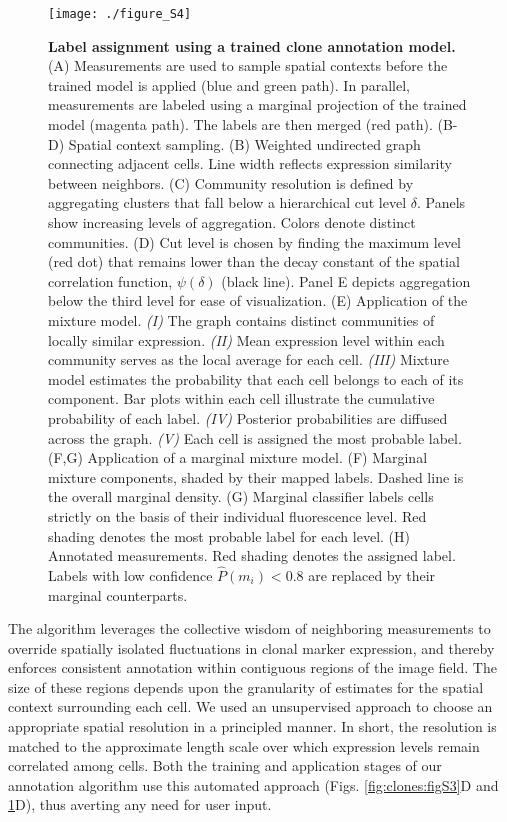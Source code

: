 \begin{figure}[h]
\texttt{[image: ./figure\_S4]}
\caption[Label assignment using a trained clone annotation model.]{\textbf{Label assignment using a trained clone annotation model.} (A) Measurements are used to sample spatial contexts before the trained model is applied (blue and green path). In parallel, measurements are labeled using a marginal projection of the trained model (magenta path). The labels are then merged (red path). (B-D) Spatial context sampling. (B) Weighted undirected graph connecting adjacent cells. Line width reflects expression similarity between neighbors. (C) Community resolution is defined by aggregating clusters that fall below a hierarchical cut level $\delta$. Panels show increasing levels of aggregation. Colors denote distinct communities. (D) Cut level is chosen by finding the maximum level (red dot) that remains lower than the decay constant of the spatial correlation function, $\psi(\delta)$ (black line). Panel E depicts aggregation below the third level for ease of visualization. (E) Application of the mixture model. \emph{(I)} The graph contains distinct communities of locally similar expression. \emph{(II)} Mean expression level within each community serves as the local average for each cell. \emph{(III)} Mixture model estimates the probability that each cell belongs to each of its component. Bar plots within each cell illustrate the cumulative probability of each label. \emph{(IV)} Posterior probabilities are diffused across the graph. \emph{(V)} Each cell is assigned the most probable label. (F,G) Application of a marginal mixture model. (F) Marginal mixture components, shaded by their mapped labels. Dashed line is the overall marginal density. (G) Marginal classifier labels cells strictly on the basis of their individual fluorescence level. Red shading denotes the most probable label for each level. (H) Annotated measurements. Red shading denotes the assigned label. Labels with low confidence $\hat{P}(m_i)<0.8$ are replaced by their marginal counterparts.}
\label{fig:clones:figS4}
\end{figure}

The algorithm leverages the collective wisdom of neighboring measurements to override spatially isolated fluctuations in clonal marker expression, and thereby enforces consistent annotation within contiguous regions of the image field. The size of these regions depends upon the granularity of estimates for the spatial context surrounding each cell. We used an unsupervised approach to choose an appropriate spatial resolution in a principled manner. In short, the resolution is matched to the approximate length scale over which expression levels remain correlated among cells. Both the training and application stages of our annotation algorithm use this automated approach (Figs. \ref{fig:clones:figS3}D and \ref{fig:clones:figS4}D), thus averting any need for user input.

